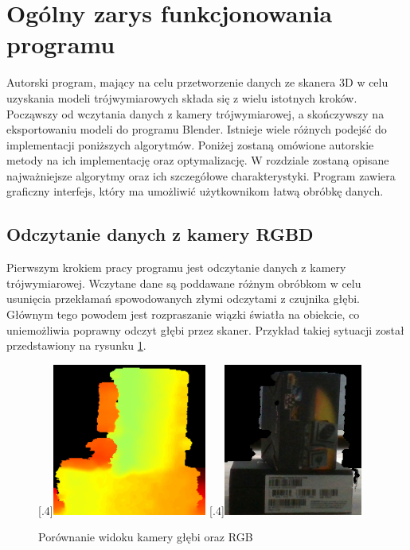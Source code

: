 \section{Ogólny zarys funkcjonowania programu}
Autorski program, mający na celu przetworzenie danych ze skanera 3D w celu uzyskania modeli trójwymiarowych składa się z wielu istotnych kroków. Począwszy od wczytania danych z kamery trójwymiarowej, a skończywszy na eksportowaniu modeli do programu Blender. Istnieje wiele różnych podejść do implementacji poniższych algorytmów. Poniżej zostaną omówione autorskie metody na ich implementację oraz optymalizację. W rozdziale zostaną opisane najważniejsze algorytmy oraz ich szczegółowe charakterystyki. Program zawiera graficzny interfejs, który ma umożliwić użytkownikom łatwą obróbkę danych.
\subsection{Odczytanie danych z kamery RGBD}
Pierwszym krokiem pracy programu jest odczytanie danych z kamery trójwymiarowej. Wczytane dane są poddawane różnym obróbkom w celu usunięcia przekłamań spowodowanych złymi odczytami z czujnika głębi. Głównym tego powodem jest rozpraszanie wiązki światła na obiekcie, co uniemożliwia poprawny odczyt głębi przez skaner. Przykład takiej sytuacji został przedstawiony na rysunku \ref{fig:depthErrorImage}.
\begin{figure}[H]
\centering
{}%
  [.4\linewidth]{\includegraphics[height=5cm]{pudelko_glebia}}
  [.4\linewidth]{\includegraphics[height=5cm]{pudelko_kolor}}
\caption{Porównanie widoku kamery głębi oraz RGB}\label{fig:depthErrorImage}
\end{figure}
